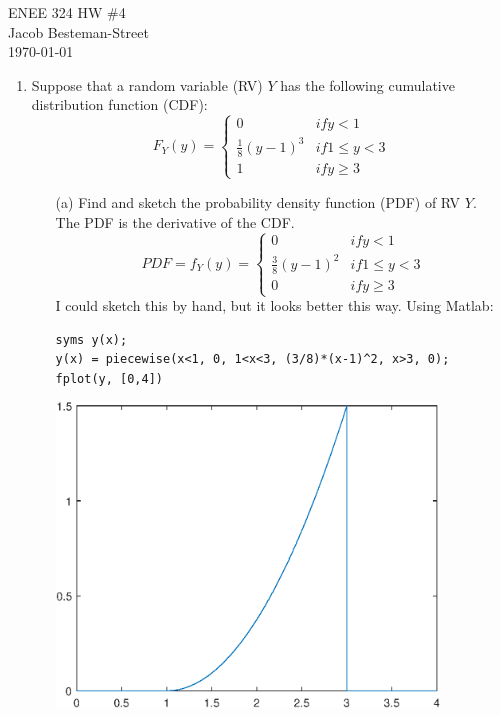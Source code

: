 \documentclass{report}
\begin{document}
ENEE 324 HW \#4 \\
Jacob Besteman-Street \\
\today \\
\begin{enumerate}
\item Suppose that a random variable (RV) $Y$ has the following cumulative distribution function (CDF): \\
$$ F_Y(y) = \left. \begin{cases}
0 & if y < 1 \\
\frac{1}{8}(y-1)^3 & if 1 \leq y < 3 \\
1 & if y \geq 3
\end{cases} \right.$$
\begin{itemize}
  \item[(a)] Find and sketch the probability density function (PDF) of RV $Y$. \\
  The PDF is the derivative of the CDF.
  $$ PDF = f_Y(y) = \left. \begin{cases}
  0 & if y < 1 \\
  \frac{3}{8}(y-1)^2 & if 1 \leq y < 3 \\
  0 & if y \geq 3
  \end{cases} \right.$$
I could sketch this by hand, but it looks better this way. Using Matlab:
\begin{verbatim}
syms y(x);
y(x) = piecewise(x<1, 0, 1<x<3, (3/8)*(x-1)^2, x>3, 0);
fplot(y, [0,4])
\end{verbatim}
\includegraphics [width=4in]{enee324hw4_01.eps}


\end{itemize}
\end{enumerate}
\end{document}
